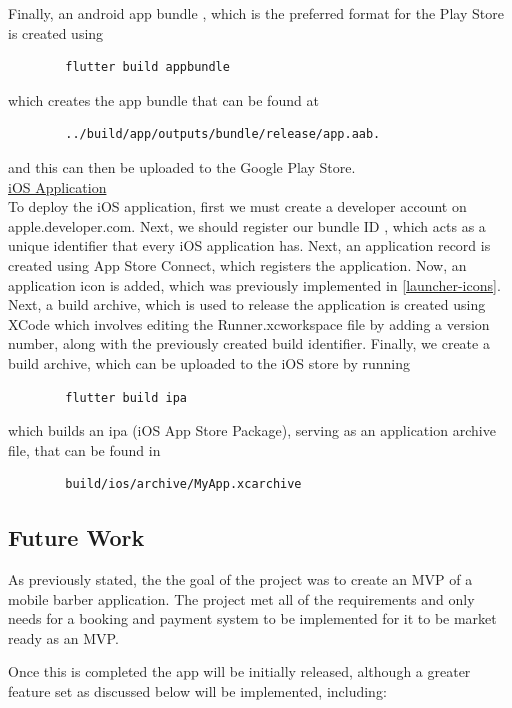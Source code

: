\documentclass[12pt]{article}
\begin{document}
	Finally, an android app bundle \cite{androidAndroidAppBundle2021}, which is the preferred format for the Play Store is created using 
	\begin{lstlisting}
		flutter build appbundle
	\end{lstlisting}
	which creates the app bundle that can be found at 
	\begin{lstlisting}
		../build/app/outputs/bundle/release/app.aab.
	\end{lstlisting}
	and this can then be uploaded to the Google Play Store.
	\\
	
	\noindent
	\underline{iOS Application}
	\\
	\noindent
	To deploy the iOS application, first we must create a developer account on apple.developer.com. Next, we should register our bundle ID \cite{appleBundleIDsApple2021}, which acts as a unique identifier that every iOS application has. Next, an application record is created using App Store Connect, which registers the application. Now, an application icon is added, which was previously implemented in \autoref{launcher-icons}. Next, a build archive, which is used to release the application is created using XCode which involves editing the Runner.xcworkspace file by adding a version number, along with the previously created build identifier.
	Finally, we create a build archive, which can be uploaded to the iOS store by running 
	\begin{lstlisting}
		flutter build ipa
	\end{lstlisting}
	which builds an ipa (iOS App Store Package), serving as an application archive file, that can be found in
	\begin{lstlisting}
		build/ios/archive/MyApp.xcarchive
	\end{lstlisting}
	
		
	\subsection{Future Work}
	
	As previously stated, the the goal of the project was to create an MVP of a mobile barber application. The project met all of the requirements and only needs for a booking and payment system to be implemented for it to be market ready as an MVP.
	
	Once this is completed the app will be initially released, although a greater feature set as discussed below will be implemented, including:
	
\end{document}
